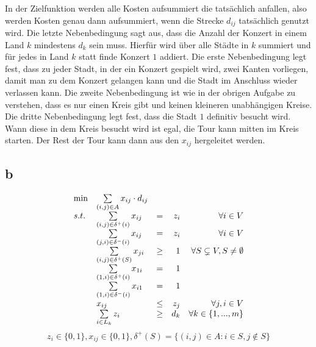 \documentclass[10pt]{article}
\begin{document}
      In der Zielfunktion werden alle Kosten aufsummiert die tatsächlich
      anfallen, also werden Kosten genau dann aufsummiert, wenn die Strecke
      $d_{ij}$ tatsächlich genutzt wird.
      Die letzte Nebenbedingung sagt aus, dass die Anzahl der Konzert in einem
      Land $k$ mindestens $d_{k}$ sein muss. Hierfür wird über alle Städte in
      $k$ summiert und für jedes in Land $k$ statt finde Konzert $1$ addiert.
      Die erste Nebenbedingung legt fest, dass zu jeder Stadt, in der ein
      Konzert gespielt wird, zwei Kanten vorliegen, damit man zu dem Konzert
      gelangen kann und die Stadt im Anschluss wieder verlassen kann. Die zweite
      Nebenbedingung ist wie in der obrigen Aufgabe zu verstehen, dass es nur
      einen Kreis gibt und keinen kleineren unabhängigen Kreise. Die dritte
      Nebenbedingung legt fest, dass die Stadt $1$ definitiv besucht wird. Wann
      diese in dem Kreis besucht wird ist egal, die Tour kann mitten im Kreis
      starten. Der Rest der Tour kann dann aus den $x_{ij}$ hergeleitet werden.

    \subsection*{b}
      \begin{displaymath}
        \begin{array}{ l l c r r }
          \min & \sum\limits_{(i,j)\in A} x_{ij}\cdot d_{ij} & & & \\
          s.t. & \sum\limits_{(i,j)\in \delta^{+}(i)} x_{ij} &=& z_{i} & \forall
                i\in V \\
          &\sum\limits_{(j,i)\in\delta^{-}(i)} x_{ij}& = & z_{i} & \forall 
            i\in V\\
            & \sum\limits_{(i,j)\in \delta^{+}(S)} x_{ji} & \geq &  1 & \forall
            S\subsetneq V, S\neq \emptyset \\
            & \sum\limits_{(1,i)\in\delta^{+}(i)} x_{1i} & = & 1 & \\
            &\sum\limits_{(1,i)\in\delta^{-}(i)} x_{i1} &=& 1 & \\
            & x_{ij} & \leq & z_{j} & \forall j,i\in V \\
            &\sum\limits_{i\in L_{k}} z_{i} & \geq & d_{k} & \forall k\in\{1,...,m\}
        \end{array}
      \end{displaymath}
      \begin{displaymath}
        z_{i}\in\{0,1\},x_{ij}\in\{0,1\}, \delta^{+}(S)=\{(i,j)\in A:i\in S, j\not\in S\}
      \end{displaymath}
\end{document}
